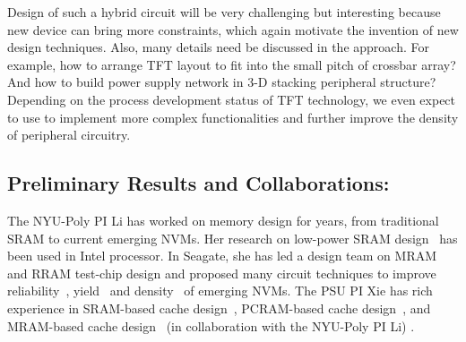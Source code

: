 Design of such a hybrid circuit will be very challenging but interesting because new device can bring more constraints, which again motivate the invention of new design techniques. Also, many details need be discussed in the approach. For example, how to arrange TFT layout to fit into the small pitch of crossbar array? And how to build power supply network in 3-D stacking peripheral structure? Depending on the process development status of TFT technology, we even expect to use to implement more complex functionalities and further improve the density of peripheral circuitry.

\subsection{Preliminary Results and Collaborations:}
The NYU-Poly PI Li has worked on memory design for years, from traditional SRAM to current emerging NVMs. Her research on low-power SRAM design ~\cite{Agarwal02,Agarwal03,Bhunia02}has been used in Intel processor. In Seagate, she has led a design team on MRAM and RRAM test-chip design and proposed many circuit techniques to improve reliability~\cite{Chen:198516,Li:502194}, yield~\cite{Li:147723,Chen:147727} and density~\cite{Li:242331,Chen:170549,Li:250027,Li:426098} of emerging NVMs. The PSU PI Xie has rich experience in SRAM-based cache design~\cite{Xie:TC09,XIE:TVLSI2008-3DCacti,Xie:MTDT09,Xie:ISCA09,xie:iccd05-3d}, PCRAM-based cache design~\cite{xie:glsvisl08-pram}, and MRAM-based cache design~\cite{XIE:HPCA09,Xie:dac08} (in collaboration with the NYU-Poly PI Li) .

